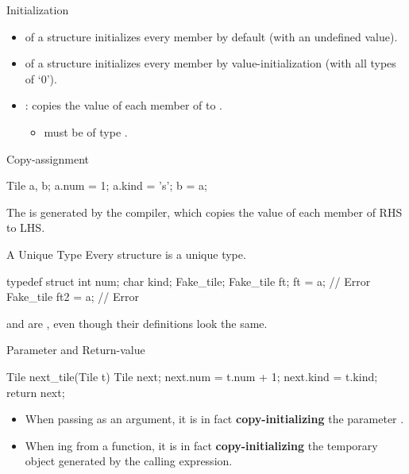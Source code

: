 \documentclass{beamer}
\begin{document}
\begin{frame}[fragile]{Initialization}
    \begin{itemize}
        \item {} of a structure initializes every member by default (with an undefined value).
        \item {} of a structure initializes every member by value-initialization (with all types of `0').
        \pause
        \item {}:  copies the value of each member of  to .
        \begin{itemize}
            \item {} must be of type .
        \end{itemize}
    \end{itemize}
\end{frame}

\begin{frame}[fragile]{Copy-assignment}
    \begin{cpp}
Tile a, b;
a.num = 1; a.kind = 's';
b = a;
    \end{cpp}
    The  is generated by the compiler, which copies the value of each member of RHS to LHS.
\end{frame}

\begin{frame}[fragile]{A Unique Type}
    Every structure is a unique type.
    \pause
    \begin{cpp}
typedef struct {
  int num;
  char kind;
} Fake_tile;
Fake_tile ft;
ft = a;             // Error
Fake_tile ft2 = a;  // Error
    \end{cpp}
     and  are , even though their definitions look the same.
\end{frame}

\begin{frame}[fragile]{Parameter and Return-value}
    \begin{cpp}
Tile next_tile(Tile t) {
  Tile next;
  next.num = t.num + 1;
  next.kind = t.kind;
  return next;
}
    \end{cpp}
    \pause
    \begin{itemize}
        \item When passing as an argument, it is in fact \textbf{copy-initializing} the parameter .
        \item When ing from a function, it is in fact \textbf{copy-initializing} the temporary object generated by the calling expression. 
    \end{itemize}
\end{frame}
\end{document}
